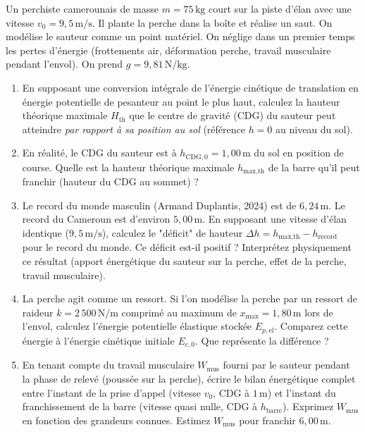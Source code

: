 \documentclass[11pt]{article}
\begin{document}
\begin{exercice}
\label{exo:probatoire_perche}
Un perchiste camerounais de masse $m = 75\,\text{kg}$ court sur la piste d'élan avec une vitesse $v_0 = 9,5\,\text{m/s}$. Il plante la perche dans la boîte et réalise un saut. On modélise le sauteur comme un point matériel. On néglige dans un premier temps les pertes d'énergie (frottements air, déformation perche, travail musculaire pendant l'envol). On prend $g = 9,81\,\text{N/kg}$.
\begin{enumerate}
    \item En supposant une conversion intégrale de l'énergie cinétique de translation en énergie potentielle de pesanteur au point le plus haut, calculez la hauteur théorique maximale $H_{\text{th}}$ que le centre de gravité (CDG) du sauteur peut atteindre \emph{par rapport à sa position au sol} (référence $h=0$ au niveau du sol).
    \item En réalité, le CDG du sauteur est à $h_{\text{CDG},0} = 1,00\,\text{m}$ du sol en position de course. Quelle est la hauteur théorique maximale $h_{\text{max,th}}$ de la barre qu'il peut franchir (hauteur du CDG au sommet) ?
    \item Le record du monde masculin (Armand Duplantis, 2024) est de $6,24\,\text{m}$. Le record du Cameroun est d'environ $5,00\,\text{m}$. En supposant une vitesse d'élan identique ($9,5\,\text{m/s}$), calculez le "déficit" de hauteur $\Delta h = h_{\text{max,th}} - h_{\text{record}}$ pour le record du monde. Ce déficit est-il positif ? Interprétez physiquement ce résultat (apport énergétique du sauteur sur la perche, effet de la perche, travail musculaire).
    \item La perche agit comme un ressort. Si l'on modélise la perche par un ressort de raideur $k = 2\,500\,\text{N/m}$ comprimé au maximum de $x_{\text{max}} = 1,80\,\text{m}$ lors de l'envol, calculez l'énergie potentielle élastique stockée $E_{p,\text{el}}$. Comparez cette énergie à l'énergie cinétique initiale $E_{c,0}$. Que représente la différence ?
    \item En tenant compte du travail musculaire $W_{\text{mus}}$ fourni par le sauteur pendant la phase de relevé (poussée sur la perche), écrire le bilan énergétique complet entre l'instant de la prise d'appel (vitesse $v_0$, CDG à $1\,\text{m}$) et l'instant du franchissement de la barre (vitesse quasi nulle, CDG à $h_{\text{barre}}$). Exprimez $W_{\text{mus}}$ en fonction des grandeurs connues. Estimez $W_{\text{mus}}$ pour franchir $6,00\,\text{m}$.
\end{enumerate}
\end{exercice}
\end{document}
